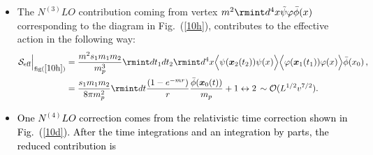 \begin{itemize}
\begin{align}
    \begin{split}
        \mathcal{S}_{\text{eff}}^{0}\Big|_{\text{fig}(\ref{10c})}&=\frac{s_1m_1m_2}{m_p^3}\rmint\Bar{\mathcal{D}}\Hat{\xi}\rmint dt_1 \,\frac{\Bar{\phi}(\boldsymbol{x}_1(t_1))}{m_p}\tilde{\psi}(\boldsymbol{x}_1(t_1))\rmint dt_2 \tilde{\psi}(\boldsymbol{x}_2(t_2))\,,\\ &
        =\frac{s_1m_1m_2}{m_p^3}\rmint dt_1\,dt_2\,\Bar{\phi}(\boldsymbol{x}_1(t_1))\Big\langle\tilde{\psi}(\boldsymbol{x}_1(t_1))\tilde{\psi}(\boldsymbol{x}_2(t_2))\Big\rangle\,, \\ &
        =\frac{s_1m_1m_2}{8\pi m_p^2}\rmint dt\, \frac{1}{r} \frac{\Bar{\phi}(\boldsymbol{x}_1(t))}{m_p}+(1\leftrightarrow 2)\,\,\sim\mathcal{O}({L^{1/2}v^{5/2}}).
    \end{split}
\end{align}
\item  The $N^{(3)}LO$ contribution coming from vertex $m^2 \rmint d^4x \Tilde{\psi}\varphi\Bar{\phi}(x)$ corresponding to the diagram in Fig.~(\ref{10h}), contributes to the effective action in the following way:
\begin{align}
    \begin{split}
\mathcal{S}_{\text{eff}}\Big |_{\text{fig}(\ref{10h})}&=\frac{m^2 s_1m_1m_2}{m_p^3}\rmint dt_1dt_2\rmint d^4x \Big\langle \psi(\boldsymbol{x}_2(t_2))\psi(x)\Big\rangle \Big\langle\varphi(\boldsymbol{x}_1(t_1))\varphi(x) \Big\rangle \bar{\phi}(x_0)\,,\\&
=\frac{s_1m_1m_2}{8\pi m_p^2}\rmint dt \frac{(1-e^{-mr})}{r}\frac{\bar{\phi}(\boldsymbol{x}_0(t))}{m_p}+1\leftrightarrow 2\,\sim\mathcal{O}(L^{1/2}v^{7/2}).
    \end{split}
\end{align}
\item \textcolor{black}{One $N^{(4)}LO$ correction comes from the relativistic time correction shown in Fig.~(\ref{10d}). After the time integrations and an integration by parts, the reduced contribution is}

\end{itemize}
